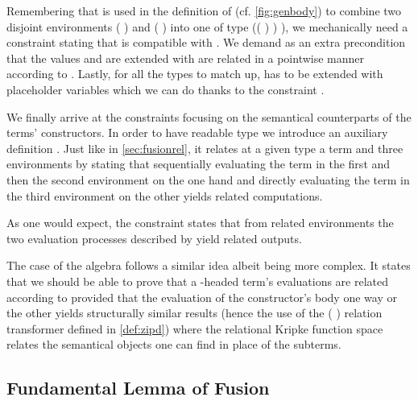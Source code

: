 
Remembering that \AF{\_>>\_} is used in the definition of 
(cf. \cref{fig:genbody})
to combine two disjoint environments {( )  } and
{( )  } into one of type
{(( \AF{++} ) )  )}, we mechanically need a
constraint stating that \AF{\_>>\_} is compatible with . We demand
as an extra precondition that the values  and  are extended
with are related in a pointwise manner according to . Lastly, for all
the types to match up,  has to be extended with placeholder variables
which we can do thanks to the  constraint .


We finally arrive at the constraints focusing on the semantical counterparts
of the terms' constructors. In order to have readable type we introduce an
auxiliary definition . Just like in \cref{sec:fusionrel}, it relates at
a given type a term and three environments by stating that sequentially evaluating
the term in the first and then the second environment on the one hand and directly
evaluating the term in the third environment on the other yields related computations.


As one would expect, the  constraint states that from related environments
the two evaluation processes described by  yield related outputs.


The case of the algebra follows a similar idea albeit being more complex.
It states that we should be able to prove that a -headed term's
evaluations are related according to  provided that the evaluation
of the constructor's body one way or the other yields structurally similar
results (hence the use of the ({  })
relation transformer defined in \cref{def:zipd}) where the relational
Kripke function space relates the semantical objects one can find in place
of the subterms.


\subsection{Fundamental Lemma of Fusion}

